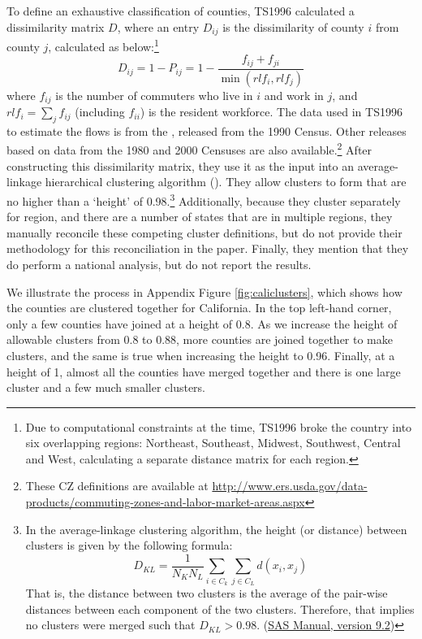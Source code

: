 To define an exhaustive classification of counties, TS1996 calculated a dissimilarity matrix $D$, where an entry $D_{ij}$ is the dissimilarity of county $i$ from county $j$, calculated as below:\footnote{Due to computational constraints at the time, TS1996 broke the country into six overlapping regions: Northeast, Southeast, Midwest, Southwest, Central and West, calculating a separate distance matrix for each region.}
\begin{equation}\label{eqn:distance}
D_{ij} = 1- P_{ij} = 1- \frac{f_{ij} + f_{ji}}{\min(rlf_i,rlf_j)}
\end{equation}
where $f_{ij}$ is the number of commuters who live in $i$ and work in $j$, and $rlf_i = \sum_{j} f_{ij}$ (including $f_{ii}$) is the resident workforce. The data used in TS1996 to estimate the flows is from the , released from the 1990 Census. Other releases based on data from the 1980 and 2000 Censuses are also available.\footnote{These CZ definitions are available at \url{http://www.ers.usda.gov/data-products/commuting-zones-and-labor-market-areas.aspx}}
After constructing this dissimilarity matrix, they use it as the input into an average-linkage hierarchical clustering algorithm (). They allow clusters to form that are no higher than a `height' of 0.98.\footnote{In the average-linkage clustering algorithm, the height (or distance) between clusters is given by the following formula:
\[
D_{KL} = \frac{1}{N_K N_L} \sum_{i \in C_k} \sum_{j \in C_L} d(x_i,x_j)
\]
That is, the distance between two clusters is the average of the pair-wise distances between each component of the two clusters. Therefore, that implies no clusters were merged such that $D_{KL}>0.98$.  (\href{https://support.sas.com/documentation/cdl/en/statug/63347/HTML/default/viewer.htm\#cluster_toc.htm}{SAS Manual, version 9.2})} Additionally, because they cluster separately for region, and there are a number of states that are in multiple regions, they manually reconcile these competing cluster definitions, but do not provide their methodology for this reconciliation in the paper. Finally, they mention that they do perform a national analysis, but do not report the results.

We illustrate the process in Appendix Figure \ref{fig:caliclusters}, which shows how the counties are clustered together for California. In the top left-hand corner, only a few counties have joined at a height of 0.8. As we increase the height of allowable clusters from 0.8 to 0.88, more counties are joined together to make clusters, and the same is true when increasing the height to 0.96. Finally, at a height of 1, almost all the counties have merged together and there is one large cluster and a few much smaller clusters.

